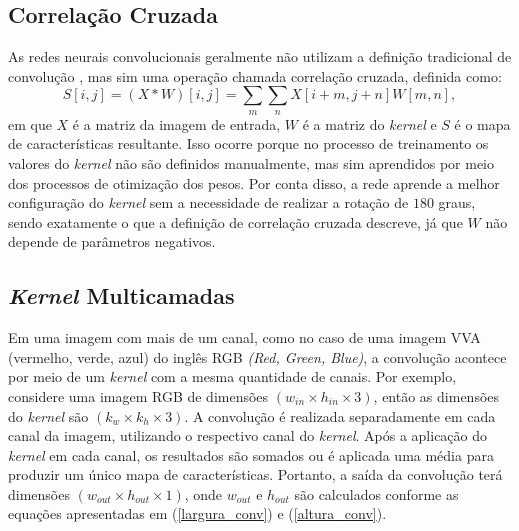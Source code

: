 \subsection{Correlação Cruzada}
As redes neurais convolucionais geralmente não utilizam a definição tradicional de convolução \cite{Goodfellow-et-al-2016}, mas sim uma operação chamada correlação cruzada, definida como:
\begin{equation}
    \label{eq:correlacao}
    S[i,j] = (X*W)[i,j] = \sum_{m}\sum_{n} X[i+m,j+n]W[m,n],
\end{equation}
em que $X$ é a matriz da imagem de entrada, $W$ é a matriz do \textit{kernel} e $S$ é o mapa de características resultante. Isso ocorre porque no processo de treinamento os valores do \textit{kernel} não são definidos manualmente, mas sim aprendidos por meio dos processos de otimização dos pesos. Por conta disso, a rede aprende a melhor configuração do \textit{kernel} sem a necessidade de realizar a rotação de $180$ graus, sendo exatamente o que a definição de correlação cruzada descreve, já que $W$ não depende de parâmetros negativos. 


\subsection{\textit{Kernel} Multicamadas}
Em uma imagem com mais de um canal, como no caso de uma imagem VVA (vermelho, verde, azul) do inglês RGB \textit{(Red, Green, Blue)}, a convolução acontece por meio de um \textit{kernel} com a mesma quantidade de canais. Por exemplo, considere uma imagem RGB de dimensões \textbf{$(w_{in}\times h_{in}\times 3)$}, então as dimensões do \textit{kernel} são \textbf{$(k_w\times k_h\times 3)$}. A convolução é realizada separadamente em cada canal da imagem, utilizando o respectivo canal do \textit{kernel}. Após a aplicação do \textit{kernel} em cada canal, os resultados são somados ou é aplicada uma média para produzir um único mapa de características. Portanto, a saída da convolução terá dimensões \textbf{$(w_{out}\times h_{out}\times 1)$}, onde $w_{out}$ e $h_{out}$ são calculados conforme as equações apresentadas em (\ref{largura_conv}) e (\ref{altura_conv}).

